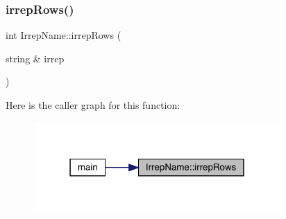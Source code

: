 \subsubsection{\texorpdfstring{irrepRows()}{irrepRows()}}
{\footnotesize\ttfamily int Irrep\+Name\+::irrep\+Rows (\begin{DoxyParamCaption}\item[{string \&}]{irrep }\end{DoxyParamCaption})}

Here is the caller graph for this function\+:
\nopagebreak
\begin{figure}[H]
\begin{center}
\leavevmode
\includegraphics[width=267pt]{d8/dcc/namespaceIrrepName_a3964736788de2a425b5a41ff069f907b_icgraph}
\end{center}
\end{figure}
